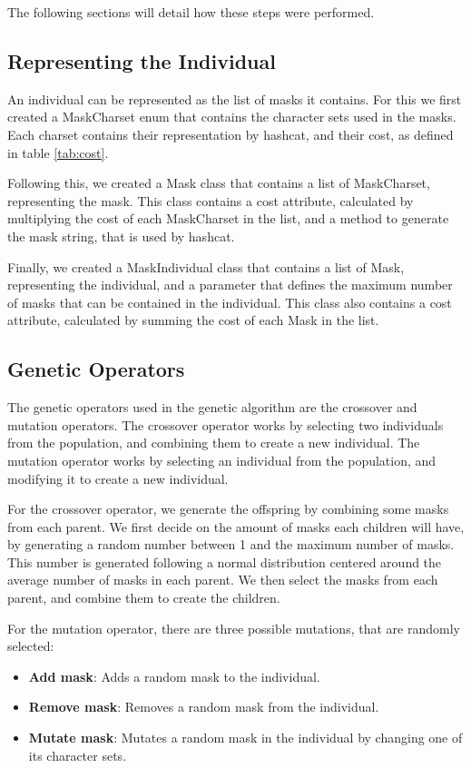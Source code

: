 \documentclass[sigconf,authordraft]{acmart}
\begin{document}
The following sections will detail how these steps were performed.

\subsection{Representing the Individual}

An individual can be represented as the list of masks it contains.
For this we first created a MaskCharset enum that contains the character sets used in the masks.
Each charset contains their representation by hashcat, and their cost, as defined in table \ref{tab:cost}.

Following this, we created a Mask class that contains a list of MaskCharset, representing the mask.
This class contains a cost attribute, calculated by multiplying the cost of each MaskCharset in the list, and a method to generate the mask string, that is used by hashcat.

Finally, we created a MaskIndividual class that contains a list of Mask, representing the individual, and a parameter that defines the maximum number of masks that can be contained in the individual.
This class also contains a cost attribute, calculated by summing the cost of each Mask in the list.

\subsection{Genetic Operators}

The genetic operators used in the genetic algorithm are the crossover and mutation operators.
The crossover operator works by selecting two individuals from the population, and combining them to create a new individual.
The mutation operator works by selecting an individual from the population, and modifying it to create a new individual.

For the crossover operator, we generate the offspring by combining some masks from each parent.
We first decide on the amount of masks each children will have, by generating a random number between 1 and the maximum number of masks.
This number is generated following a normal distribution centered around the average number of masks in each parent.
We then select the masks from each parent, and combine them to create the children.

For the mutation operator, there are three possible mutations, that are randomly selected:

\begin{itemize}
  \item \textbf{Add mask}: Adds a random mask to the individual.
  \item \textbf{Remove mask}: Removes a random mask from the individual.
  \item \textbf{Mutate mask}: Mutates a random mask in the individual by changing one of its character sets.
\end{itemize}
\end{document}
